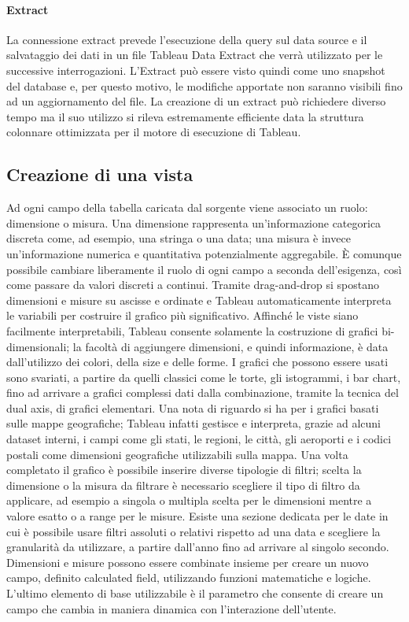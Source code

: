\paragraph{Extract}

La connessione extract prevede l'esecuzione della query sul data source e il salvataggio dei dati in un file Tableau Data Extract che verrà utilizzato per le successive interrogazioni. L'Extract può essere visto quindi come uno snapshot del database e, per questo motivo, le modifiche apportate non saranno visibili fino ad un aggiornamento del file. La creazione di un extract può richiedere diverso tempo ma il suo utilizzo si rileva estremamente efficiente data la struttura colonnare ottimizzata per il motore di esecuzione di Tableau.

\subsection{Creazione di una vista}

Ad ogni campo della tabella caricata dal sorgente viene associato un ruolo: dimensione o misura. Una dimensione rappresenta un'informazione categorica discreta come, ad esempio, una stringa o una data; una misura è invece un'informazione numerica e quantitativa potenzialmente aggregabile. È comunque possibile cambiare liberamente il ruolo di ogni campo a seconda dell'esigenza, così come passare da valori discreti a continui. Tramite drag-and-drop si spostano dimensioni e misure su ascisse e ordinate e Tableau automaticamente interpreta le variabili per costruire il grafico più significativo. Affinché le viste siano facilmente interpretabili, Tableau consente solamente la costruzione di grafici bi-dimensionali; la facoltà di aggiungere dimensioni, e quindi informazione, è data dall'utilizzo dei colori, della size e delle forme. I grafici che possono essere usati sono svariati, a partire da quelli classici come le torte, gli istogrammi, i bar chart, fino ad arrivare a grafici complessi dati dalla combinazione, tramite la tecnica del dual axis, di grafici elementari. Una nota di riguardo si ha per i grafici basati sulle mappe geografiche; Tableau infatti gestisce e interpreta, grazie ad alcuni dataset interni, i campi come gli stati, le regioni, le città, gli aeroporti e i codici postali come dimensioni geografiche utilizzabili sulla mappa. Una volta completato il grafico è possibile inserire diverse tipologie di filtri; scelta la dimensione o la misura da filtrare è necessario scegliere il tipo di filtro da applicare, ad esempio a singola o multipla scelta per le dimensioni mentre a valore esatto o a range per le misure. Esiste una sezione dedicata per le date in cui è possibile usare filtri assoluti o relativi rispetto ad una data e scegliere la granularità da utilizzare, a partire dall'anno fino ad arrivare al singolo secondo. Dimensioni e misure possono essere combinate insieme per creare un nuovo campo, definito calculated field, utilizzando funzioni matematiche e logiche. L'ultimo elemento di base utilizzabile è il parametro che consente di creare un campo che cambia in maniera dinamica con l'interazione dell'utente.

